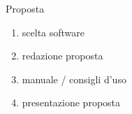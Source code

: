 \documentclass[compress,9pt,handout]{beamer}
\newcommand{\sw}{\foreignlanguage{english}{software}\xspace}
\begin{document}
\begin{frame}
\begin{columns}
{\begin{block}{ Proposta}
  \begin{enumerate}
    \item scelta \sw
    \item redazione proposta
    \item manuale / consigli d'uso
    \item presentazione proposta
  \end{enumerate}
\end{block}
}
\end{columns}

\end{frame}
\end{document}

